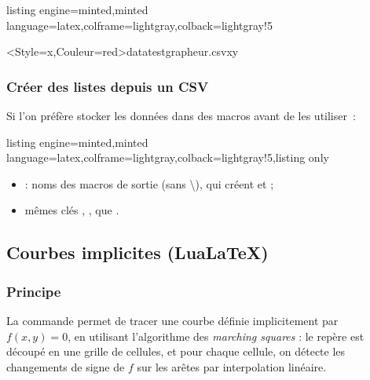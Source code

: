 \documentclass[11pt,a4paper]{ltxdoc}
\begin{document}
\begin{tcblisting}{listing engine=minted,minted language=latex,colframe=lightgray,colback=lightgray!5}
\begin{GraphiqueTikz}%
    [x=0.08cm,y=0.833cm,Xmin=0,Xmax=110,Ymin=0,Ymax=6,Xgrille=10,Xgrilles=10,Ygrilles=1]
  \TracerNuageDepuisCSV%
    [ModeTransfo=lny]%
    <Style=x,Couleur=red>{datatestgrapheur.csv}{x}{y}
\end{GraphiqueTikz}
\end{tcblisting}

\subsubsection{Créer des listes depuis un CSV}

Si l'on préfère stocker les données dans des macros avant de les utiliser~:

\begin{tcblisting}{listing engine=minted,minted language=latex,colframe=lightgray,colback=lightgray!5,listing only}
\end{tcblisting}

\begin{itemize}
  \item {} : noms des macros de sortie (sans \textbackslash), qui créent  et  ;
  \item mêmes clés , ,  que .
\end{itemize}

\pagebreak

\subsection{Courbes implicites (LuaLaTeX)}\label{implicit}

\subsubsection{Principe}

La commande  permet de tracer une courbe définie implicitement par $f(x,y)=0$, en utilisant l'algorithme des \textit{marching squares} : le repère est découpé en une grille de cellules, et pour chaque cellule, on détecte les changements de signe de $f$ sur les arêtes par interpolation linéaire.
\end{document}
